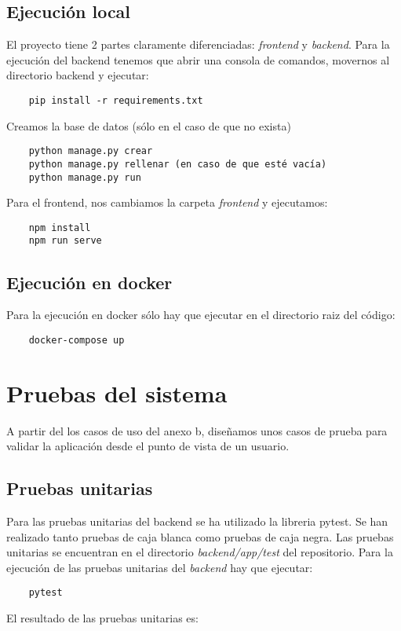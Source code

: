 \subsection {Ejecución local}
El proyecto tiene 2 partes claramente diferenciadas: \emph{frontend} y \emph{backend}.
Para la ejecución del backend tenemos que abrir una consola de comandos, movernos al directorio backend 
y ejecutar:
\begin{verbatim}
	pip install -r requirements.txt
\end{verbatim}

Creamos la base de datos (sólo en el caso de que no exista)
\begin{verbatim}
	python manage.py crear
	python manage.py rellenar (en caso de que esté vacía)
	python manage.py run
\end{verbatim}

Para el frontend, nos cambiamos la carpeta \emph{frontend} y ejecutamos:
\begin{verbatim}
	npm install
	npm run serve
\end{verbatim}

\subsection {Ejecución en docker}
Para la ejecución en docker sólo hay que ejecutar en el directorio raiz del código:
\begin{verbatim}
	docker-compose up
\end{verbatim}
\newpage
\section{Pruebas del sistema}

A partir del los casos de uso del anexo b, diseñamos unos casos de prueba para 
validar la aplicación desde el punto de vista de un usuario.

\subsection{Pruebas unitarias}
Para las pruebas unitarias del backend se ha utilizado la libreria pytest.
Se han realizado tanto pruebas de caja blanca como pruebas de caja negra.
Las pruebas unitarias se encuentran en el directorio \emph{backend/app/test} del repositorio.
Para la ejecución de las pruebas unitarias del \emph{backend} hay que ejecutar:
\begin{verbatim}
	pytest
\end{verbatim}
El resultado de las pruebas unitarias es:

